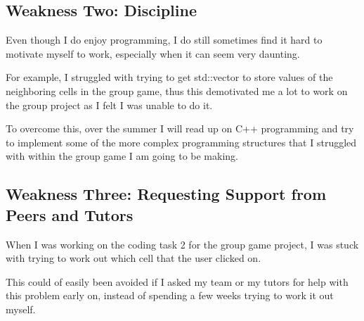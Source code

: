 \documentclass{scrartcl}
\begin{document}
{\subsection{Weakness Two: Discipline}

Even though I do enjoy programming, I do still sometimes find it hard to motivate myself to work, especially when it can seem very daunting. 


For example, I struggled with trying to get std::vector to store values of the neighboring cells in the group game, thus this demotivated me a lot to work on the group project as I felt I was unable to do it.

To overcome this, over the summer I will read up on C++ programming and try to implement some of the more complex programming structures  that I struggled with within the group game I am going to be making.

\subsection{Weakness Three: Requesting Support from Peers and Tutors}


When I was working on the coding task 2 for the group game project, I was stuck with trying to work out which cell that the user clicked on.


This could of easily been avoided if I asked my team or my tutors for help with this problem early on, instead of spending a few weeks trying to work it out myself.


}
\end{document}
